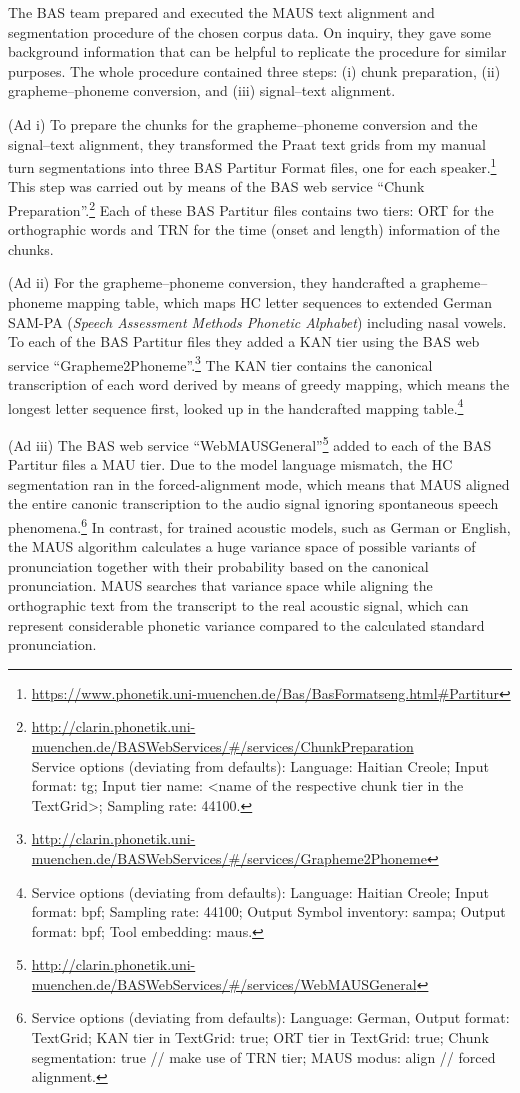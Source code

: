 \documentclass[output=paper]{langsci/langscibook}
\begin{document}
The BAS team prepared and executed the MAUS text alignment and segmentation procedure of the chosen corpus data. On inquiry, they gave some background information that can be helpful to replicate the procedure for similar purposes. The whole procedure contained three steps: (i) chunk preparation, (ii) grapheme–phoneme conversion, and (iii) signal–text alignment.

(Ad i) To prepare the chunks for the grapheme–phoneme conversion and the signal–text alignment, they transformed the Praat text grids from my manual turn segmentations into three BAS Partitur Format files, one for each speaker.\footnote{\url{https://www.phonetik.uni-muenchen.de/Bas/BasFormatseng.html\#Partitur}} This step was carried out by means of the BAS web service “Chunk Preparation”.\footnote{\url{http://clarin.phonetik.uni-muenchen.de/BASWebServices/\#/services/ChunkPreparation}\\ Service options (deviating from defaults): Language: Haitian Creole; Input format: tg; Input tier name: {<}name of the respective chunk tier in the TextGrid{>}; Sampling rate: 44100.} Each of these BAS Partitur files contains two tiers: ORT for the orthographic words and TRN for the time (onset and length) information of the chunks. 

(Ad ii) For the grapheme–phoneme conversion, they handcrafted a grapheme–phoneme mapping table, which maps HC letter sequences to extended German SAM-PA (\textit{Speech Assessment Methods Phonetic Alphabet}) including nasal vowels. To each of the BAS Partitur files they added a KAN tier using the BAS web service “Grapheme2Phoneme”.\footnote{\url{http://clarin.phonetik.uni-muenchen.de/BASWebServices/\#/services/Grapheme2Phoneme}} The KAN tier contains the canonical transcription of each word derived by means of greedy mapping, which means the longest letter sequence first, looked up in the handcrafted mapping table.\footnote{Service options (deviating from defaults): Language: Haitian Creole; Input format: bpf; Sampling rate: 44100; Output Symbol inventory: sampa; Output format: bpf; Tool embedding: maus.}

(Ad iii) The BAS web service “WebMAUSGeneral”\footnote{\url{http://clarin.phonetik.uni-muenchen.de/BASWebServices/\#/services/WebMAUSGeneral}} added to each of the BAS Partitur files a MAU tier. Due to the model language mismatch, the HC segmentation ran in the forced-alignment mode, which means that MAUS aligned the entire canonic transcription to the audio signal ignoring spontaneous speech phenomena.\footnote{Service options (deviating from defaults): Language: German, Output format: TextGrid; KAN tier in TextGrid: true; ORT tier in TextGrid: true; Chunk segmentation: true // make use of TRN tier; MAUS modus: align // forced alignment.} In contrast, for trained acoustic models, such as German or English, the MAUS algorithm calculates a huge variance space of possible variants of pronunciation together with their probability based on the canonical pronunciation. MAUS searches that variance space while aligning the orthographic text from the transcript to the real acoustic signal, which can represent considerable phonetic variance compared to the calculated standard pronunciation. 
\end{document}
